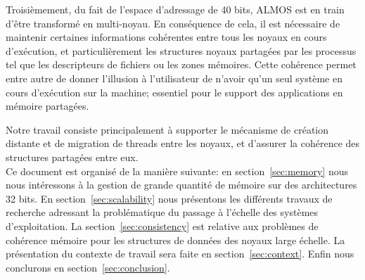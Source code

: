   Troisièmement, du fait de l'espace d'adressage de 40 bits, ALMOS est en train
  d'être transformé en multi-noyau. En conséquence de cela, il est nécessaire de
  maintenir certaines informations cohérentes entre tous les noyaux en cours
  d'exécution, et particulièrement les structures noyaux partagées par les
  processus tel que les descripteurs de fichiers ou les zones mémoires. Cette
  cohérence permet entre autre de donner l'illusion à l'utilisateur de n'avoir
  qu'un seul système en cours d'exécution sur la machine; essentiel pour le
  support des applications en mémoire partagées.

  Notre travail consiste principalement à supporter le mécanisme de création
  distante et de migration de threads entre les noyaux, et d'assurer la
  cohérence des structures partagées entre eux.\\

  \hspace{1cm}Ce document est organisé de la manière suivante: en
  section~\ref{sec:memory} nous nous intéressons à la gestion de grande quantité
  de mémoire sur des architectures 32 bits. En section~\ref{sec:scalability}
  nous présentons les différents travaux de recherche adressant la problématique
  du passage à l'échelle des systèmes d'exploitation.  La
  section~\ref{sec:consistency} est relative aux problèmes de cohérence mémoire
  pour les structures de données des noyaux large échelle. La présentation du
  contexte de travail sera faite en section~\ref{sec:context}. Enfin nous
  conclurons en section~\ref{sec:conclusion}.\newline
